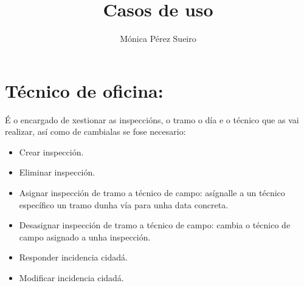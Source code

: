 \documentclass[a4paper,10pt]{article}
\title{Casos de uso}
\author{Mónica Pérez Sueiro	}
\begin{document}
\maketitle

\section{Técnico de oficina:} É o encargado de xestionar as inspeccións, o tramo o día e o técnico que as vai realizar, así 
como de cambialas se fose necesario:
\begin{itemize}
 \item Crear inspección.
 \item Eliminar inspección.
 \item Asignar inspección de tramo a técnico de campo: asígnalle a un técnico específico un tramo dunha vía para unha data concreta.
 \item Desasignar inspección de tramo a técnico de campo: cambia o técnico de campo asignado a unha inspección.
 \item Responder incidencia cidadá.
 \item Modificar incidencia cidadá.
 \
\end{itemize}
\end{document}
